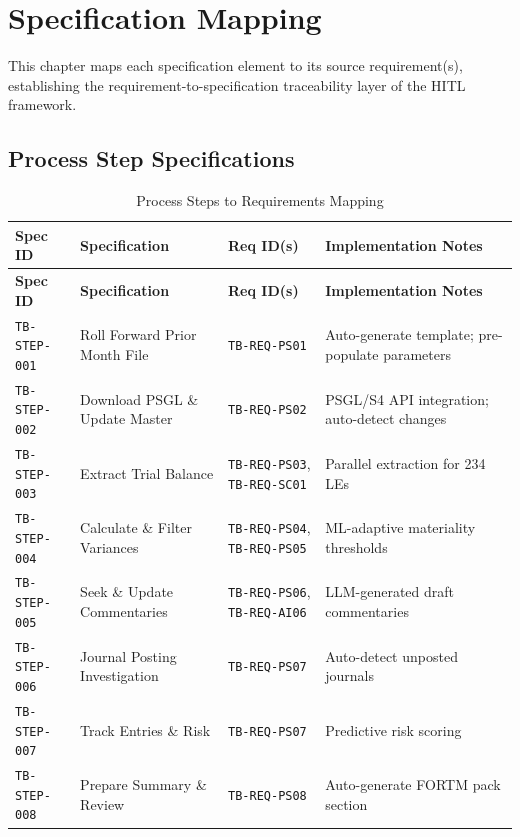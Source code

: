 \documentclass[11pt,a4paper,twoside]{report}
\newcommand{\reqref}[1]{\texttt{#1}}
\newcommand{\specref}[1]{\texttt{#1}}
\begin{document}
\chapter{Specification Mapping}
\label{ch:specification-mapping}

This chapter maps each specification element to its source requirement(s),
establishing the requirement-to-specification traceability layer of the
HITL framework.

\section{Process Step Specifications}
\label{sec:process-step-specs}

\begin{longtable}{@{}C{2cm}L{3.5cm}C{3cm}L{5cm}@{}}
\caption{Process Steps to Requirements Mapping}
\label{tab:process-steps-mapping} \\
\toprule
\textbf{Spec ID} & \textbf{Specification} & \textbf{Req ID(s)} & \textbf{Implementation Notes} \\
\midrule
\endfirsthead
\toprule
\textbf{Spec ID} & \textbf{Specification} & \textbf{Req ID(s)} & \textbf{Implementation Notes} \\
\midrule
\endhead
\specref{TB-STEP-001} & Roll Forward Prior Month File & \reqref{TB-REQ-PS01} & Auto-generate template; pre-populate parameters \\
\specref{TB-STEP-002} & Download PSGL \& Update Master & \reqref{TB-REQ-PS02} & PSGL/S4 API integration; auto-detect changes \\
\specref{TB-STEP-003} & Extract Trial Balance & \reqref{TB-REQ-PS03}, \reqref{TB-REQ-SC01} & Parallel extraction for 234 LEs \\
\specref{TB-STEP-004} & Calculate \& Filter Variances & \reqref{TB-REQ-PS04}, \reqref{TB-REQ-PS05} & ML-adaptive materiality thresholds \\
\specref{TB-STEP-005} & Seek \& Update Commentaries & \reqref{TB-REQ-PS06}, \reqref{TB-REQ-AI06} & LLM-generated draft commentaries \\
\specref{TB-STEP-006} & Journal Posting Investigation & \reqref{TB-REQ-PS07} & Auto-detect unposted journals \\
\specref{TB-STEP-007} & Track Entries \& Risk & \reqref{TB-REQ-PS07} & Predictive risk scoring \\
\specref{TB-STEP-008} & Prepare Summary \& Review & \reqref{TB-REQ-PS08} & Auto-generate FORTM pack section \\
\bottomrule
\end{longtable}
\end{document}

